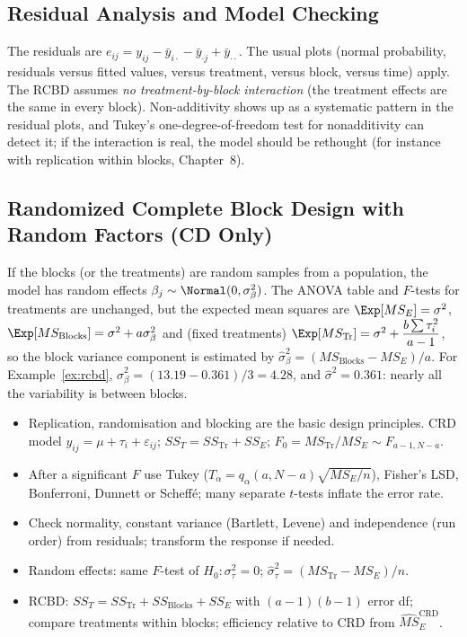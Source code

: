 \subsection{Residual Analysis and Model Checking}

The residuals are $e_{ij}=y_{ij}-\bar{y}_{i\cdot}-\bar{y}_{\cdot j}+\bar{y}_{\cdot\cdot}$. The usual plots (normal probability, residuals versus fitted values, versus treatment, versus block, versus time) apply. The RCBD assumes \emph{no treatment-by-block interaction} (the treatment effects are the same in every block). Non-additivity shows up as a systematic pattern in the residual plots, and Tukey's one-degree-of-freedom test for nonadditivity can detect it; if the interaction is real, the model should be rethought (for instance with replication within blocks, Chapter~8).

\subsection{Randomized Complete Block Design with Random Factors (CD Only)}

If the blocks (or the treatments) are random samples from a population, the model has random effects $\beta_j\sim\Normal(0,\sigma_\beta^2)$. The ANOVA table and $F$-tests for treatments are unchanged, but the expected mean squares are $\Exp[MS_E]=\sigma^2$, $\Exp[MS_{\mathrm{Blocks}}]=\sigma^2+a\sigma_\beta^2$ and (fixed treatments) $\Exp[MS_{\mathrm{Tr}}]=\sigma^2+\dfrac{b\sum\tau_i^2}{a-1}$, so the block variance component is estimated by $\hat\sigma_\beta^2=(MS_{\mathrm{Blocks}}-MS_E)/a$. For Example~\ref{ex:rcbd}, $\hat\sigma_\beta^2=(13.19-0.361)/3=4.28$, and $\hat\sigma^2=0.361$: nearly all the variability is between blocks.

\begin{summarybox}
\begin{itemize}
  \item Replication, randomisation and blocking are the basic design principles. CRD model $y_{ij}=\mu+\tau_i+\varepsilon_{ij}$; $SS_T=SS_{\mathrm{Tr}}+SS_E$; $F_0=MS_{\mathrm{Tr}}/MS_E\sim F_{a-1,N-a}$.
  \item After a significant $F$ use Tukey ($T_\alpha=q_\alpha(a,N-a)\sqrt{MS_E/n}$), Fisher's LSD, Bonferroni, Dunnett or Scheff\'e; many separate $t$-tests inflate the error rate.
  \item Check normality, constant variance (Bartlett, Levene) and independence (run order) from residuals; transform the response if needed.
  \item Random effects: same $F$-test of $H_0:\sigma_\tau^2=0$; $\hat\sigma_\tau^2=(MS_{\mathrm{Tr}}-MS_E)/n$.
  \item RCBD: $SS_T=SS_{\mathrm{Tr}}+SS_{\mathrm{Blocks}}+SS_E$ with $(a-1)(b-1)$ error df; compare treatments within blocks; efficiency relative to CRD from $\widehat{MS}_E^{\mathrm{CRD}}$.
\end{itemize}
\end{summarybox}

